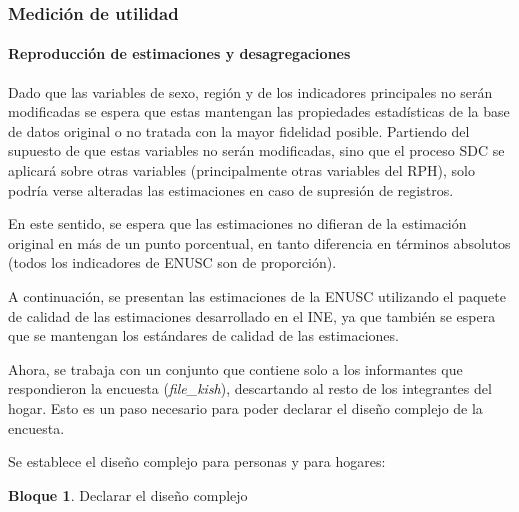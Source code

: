 \documentclass[
]{book}
\theoremstyle{definition}
\theoremstyle{definition}
\newtheorem{example}{Bloque}[chapter]
\theoremstyle{definition}
\theoremstyle{definition}
\theoremstyle{remark}
\begin{document}
\hypertarget{mediciuxf3n-de-utilidad}{%
\subsubsection{Medición de utilidad}\label{mediciuxf3n-de-utilidad}}

\hypertarget{reproducciuxf3n-de-estimaciones-y-desagregaciones}{%
\paragraph{Reproducción de estimaciones y desagregaciones}\label{reproducciuxf3n-de-estimaciones-y-desagregaciones}}

Dado que las variables de sexo, región y de los indicadores principales no serán modificadas se espera que estas mantengan las propiedades estadísticas de la base de datos original o no tratada con la mayor fidelidad posible. Partiendo del supuesto de que estas variables no serán modificadas, sino que el proceso SDC se aplicará sobre otras variables (principalmente otras variables del RPH), solo podría verse alteradas las estimaciones en caso de supresión de registros.

En este sentido, se espera que las estimaciones no difieran de la estimación original en más de un punto porcentual, en tanto diferencia en términos absolutos (todos los indicadores de ENUSC son de proporción).

A continuación, se presentan las estimaciones de la ENUSC utilizando el paquete de calidad de las estimaciones desarrollado en el INE, ya que también se espera que se mantengan los estándares de calidad de las estimaciones.

Ahora, se trabaja con un conjunto que contiene solo a los informantes que respondieron la encuesta (\emph{file\_kish}), descartando al resto de los integrantes del hogar. Esto es un paso necesario para poder declarar el diseño complejo de la encuesta.

Se establece el diseño complejo para personas y para hogares:

\begin{example}
\protect\hypertarget{exm:bloque9nbm}{}\label{exm:bloque9nbm}Declarar el diseño complejo
\end{example}
\end{document}
